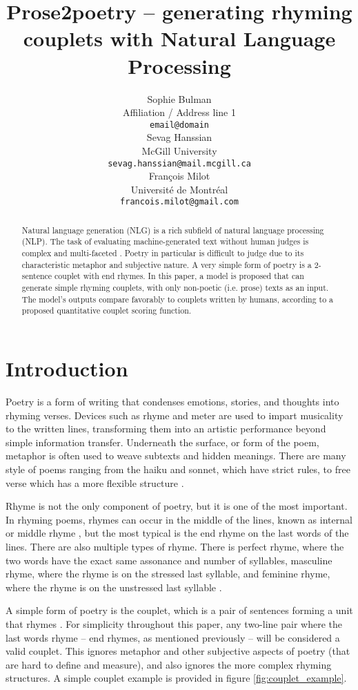 \documentclass[11pt,a4paper]{article}
\title{Prose2poetry -- generating rhyming couplets with Natural Language Processing}
\author{Sophie Bulman \\
  Affiliation / Address line 1 \\
  \texttt{email@domain} \\\And
  Sevag Hanssian \\
  McGill University \\
  \texttt{sevag.hanssian@mail.mcgill.ca} \\\AND
  François Milot \\
  Université de Montréal \\
  \texttt{francois.milot@gmail.com} \\}
\date{}
\begin{document}
\maketitle
\begin{abstract}
	Natural language generation (NLG) is a rich subfield of natural language processing (NLP). The task of evaluating machine-generated text without human judges is complex and multi-faceted \cite{nlgeval}. Poetry in particular is difficult to judge due to its characteristic metaphor and subjective nature. A very simple form of poetry is a 2-sentence couplet with end rhymes. In this paper, a model is proposed that can generate simple rhyming couplets, with only non-poetic (i.e. prose) texts as an input. The model's outputs compare favorably to couplets written by humans, according to a proposed quantitative couplet scoring function.
\end{abstract}

\section{Introduction}
\label{sec:intro}

Poetry is a form of writing that condenses emotions, stories, and thoughts into rhyming verses. Devices such as rhyme and meter are used to impart musicality to the written lines, transforming them into an artistic performance beyond simple information transfer. Underneath the surface, or form of the poem, metaphor is often used to weave subtexts and hidden meanings. There are many style of poems ranging from the haiku and sonnet, which have strict rules, to free verse which has a more flexible structure \citep{poem_type}.

Rhyme is not the only component of poetry, but it is one of the most important. In rhyming poems, rhymes can occur in the middle of the lines, known as internal or middle rhyme \cite{internal_rhyme_def}, but the most typical is the end rhyme \cite{end_rhyme_def} on the last words of the lines. There are also multiple types of rhyme. There is perfect rhyme, where the two words have the exact same assonance and number of syllables, masculine rhyme, where the rhyme is on the stressed last syllable, and feminine rhyme, where the rhyme is on the unstressed last syllable \citep{poem_rhyme_type}.

A simple form of poetry is the couplet, which is a pair of sentences forming a unit that rhymes \cite{couplet_def}. For simplicity throughout this paper, any two-line pair where the last words rhyme -- end rhymes, as mentioned previously -- will be considered a valid couplet. This ignores metaphor and other subjective aspects of poetry (that are hard to define and measure), and also ignores the more complex rhyming structures. A simple couplet example is provided in figure \ref{fig:couplet_example}.
\end{document}

